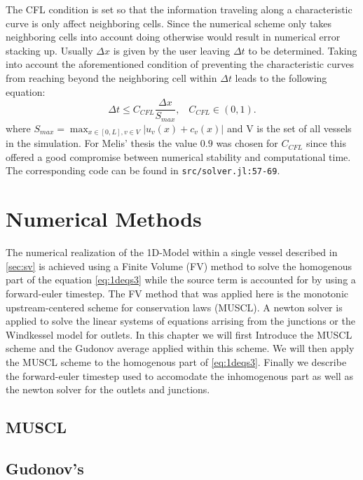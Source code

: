 \documentclass[a4paper, oneside]{discothesis}
\begin{document}
The CFL condition is set so that the information traveling along a characteristic curve is only affect neighboring cells. 
Since the numerical scheme only takes neighboring cells into account doing otherwise would result in numerical error stacking up.
Usually $\Delta x$ is given by the user leaving $\Delta t$ to be determined.
Taking into account the aforementioned condition of preventing the characteristic curves from reaching beyond the neighboring cell within $\Delta t$ leads to the following equation:
\begin{equation}
	\Delta t \leq C_{CFL} \frac{\Delta x}{S_{max}},\hspace{10pt}  C_{CFL} \in (0,1).
\end{equation}
where $S_{max} = \max_{x \in [0,L], v \in V} | u_v(x) + c_v(x) |$ and V is the set of all vessels in the simulation.  
For Melis' thesis the value $0.9$ was chosen for $C_{CFL}$ since this offered a good compromise between numerical stability and computational time.
The corresponding code can be found in \texttt{src/solver.jl:57-69}.



\chapter{Numerical Methods}
The numerical realization of the 1D-Model within a single vessel described in \autoref{sec:sv} is achieved using a Finite Volume (FV) method to solve the homogenous part of the equation \autoref{eq:1deqs3} while the source term is accounted for by using a forward-euler timestep. 
The FV method that was applied here is the monotonic upstream-centered scheme for conservation laws (MUSCL).
A newton solver is applied to solve the linear systems of equations arrising from the junctions or the Windkessel model for outlets.
In this chapter we will first Introduce the MUSCL scheme and the Gudonov average applied within this scheme.
We will then apply the MUSCL scheme to the homogenous part of \autoref{eq:1deqs3}.
Finally we describe the forward-euler timestep used to accomodate the inhomogenous part as well as the newton solver for the outlets and junctions.

\section{MUSCL} \label{sec:muscl}
\section{Gudonov's}
\end{document}
